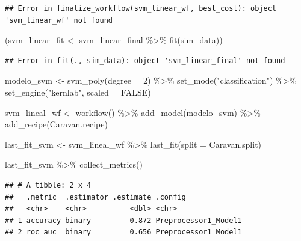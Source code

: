 \documentclass[
  12pt,
]{book}
\newenvironment{Shaded}{\begin{snugshade}}{\end{snugshade}}
\newcommand{\AttributeTok}[1]{\textcolor[rgb]{0.77,0.63,0.00}{#1}}
\newcommand{\ConstantTok}[1]{\textcolor[rgb]{0.00,0.00,0.00}{#1}}
\newcommand{\DecValTok}[1]{\textcolor[rgb]{0.00,0.00,0.81}{#1}}
\newcommand{\FunctionTok}[1]{\textcolor[rgb]{0.00,0.00,0.00}{#1}}
\newcommand{\NormalTok}[1]{#1}
\newcommand{\OtherTok}[1]{\textcolor[rgb]{0.56,0.35,0.01}{#1}}
\newcommand{\SpecialCharTok}[1]{\textcolor[rgb]{0.00,0.00,0.00}{#1}}
\newcommand{\StringTok}[1]{\textcolor[rgb]{0.31,0.60,0.02}{#1}}
\begin{document}
\begin{verbatim}
## Error in finalize_workflow(svm_linear_wf, best_cost): object 'svm_linear_wf' not found
\end{verbatim}

\begin{Shaded}
\begin{Highlighting}[]
\NormalTok{(svm\_linear\_fit }\OtherTok{\textless{}{-}}\NormalTok{ svm\_linear\_final }\SpecialCharTok{\%\textgreater{}\%}
    \FunctionTok{fit}\NormalTok{(sim\_data))}
\end{Highlighting}
\end{Shaded}

\begin{verbatim}
## Error in fit(., sim_data): object 'svm_linear_final' not found
\end{verbatim}

\begin{Shaded}
\begin{Highlighting}[]
\NormalTok{modelo\_svm }\OtherTok{\textless{}{-}} \FunctionTok{svm\_poly}\NormalTok{(}\AttributeTok{degree =} \DecValTok{2}\NormalTok{) }\SpecialCharTok{\%\textgreater{}\%}
    \FunctionTok{set\_mode}\NormalTok{(}\StringTok{"classification"}\NormalTok{) }\SpecialCharTok{\%\textgreater{}\%}
    \FunctionTok{set\_engine}\NormalTok{(}\StringTok{"kernlab"}\NormalTok{, }\AttributeTok{scaled =} \ConstantTok{FALSE}\NormalTok{)}

\NormalTok{svm\_lineal\_wf }\OtherTok{\textless{}{-}} \FunctionTok{workflow}\NormalTok{() }\SpecialCharTok{\%\textgreater{}\%}
    \FunctionTok{add\_model}\NormalTok{(modelo\_svm) }\SpecialCharTok{\%\textgreater{}\%}
    \FunctionTok{add\_recipe}\NormalTok{(Caravan.recipe)}

\NormalTok{last\_fit\_svm }\OtherTok{\textless{}{-}}\NormalTok{ svm\_lineal\_wf }\SpecialCharTok{\%\textgreater{}\%}
    \FunctionTok{last\_fit}\NormalTok{(}\AttributeTok{split =}\NormalTok{ Caravan.split)}

\NormalTok{last\_fit\_svm }\SpecialCharTok{\%\textgreater{}\%}
    \FunctionTok{collect\_metrics}\NormalTok{()}
\end{Highlighting}
\end{Shaded}

\begin{verbatim}
## # A tibble: 2 x 4
##   .metric  .estimator .estimate .config             
##   <chr>    <chr>          <dbl> <chr>               
## 1 accuracy binary         0.872 Preprocessor1_Model1
## 2 roc_auc  binary         0.656 Preprocessor1_Model1
\end{verbatim}
\end{document}
